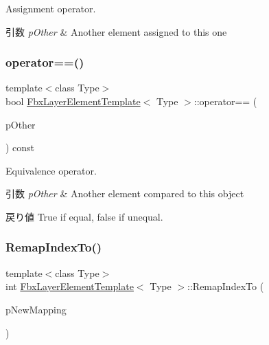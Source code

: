 Assignment operator. 
\begin{DoxyParams}{引数}
{\em p\+Other} & Another element assigned to this one \\
\hline
\end{DoxyParams}
\mbox{\label{class_fbx_layer_element_template_a2519d2a629f652904ff64840e0c45780}} 
\subsubsection{\texorpdfstring{operator==()}{operator==()}}
{\footnotesize\ttfamily template$<$class Type$>$ \\
bool \hyperlink{class_fbx_layer_element_template}{Fbx\+Layer\+Element\+Template}$<$ Type $>$\+::operator== (\begin{DoxyParamCaption}\item[{const \hyperlink{class_fbx_layer_element_template}{Fbx\+Layer\+Element\+Template}$<$ Type $>$ \&}]{p\+Other }\end{DoxyParamCaption}) const}

Equivalence operator. 
\begin{DoxyParams}{引数}
{\em p\+Other} & Another element compared to this object \\
\hline
\end{DoxyParams}
\begin{DoxyReturn}{戻り値}
{\ttfamily True} if equal, {\ttfamily false} if unequal. 
\end{DoxyReturn}
\mbox{\label{class_fbx_layer_element_template_a971c29199bb9f0674045d2510230010a}} 
\subsubsection{\texorpdfstring{Remap\+Index\+To()}{RemapIndexTo()}}
{\footnotesize\ttfamily template$<$class Type$>$ \\
int \hyperlink{class_fbx_layer_element_template}{Fbx\+Layer\+Element\+Template}$<$ Type $>$\+::Remap\+Index\+To (\begin{DoxyParamCaption}\item[{\hyperlink{class_fbx_layer_element_a5a40e95db30ae9f94611dc3f1568af26}{Fbx\+Layer\+Element\+::\+E\+Mapping\+Mode}}]{p\+New\+Mapping }\end{DoxyParamCaption})}

